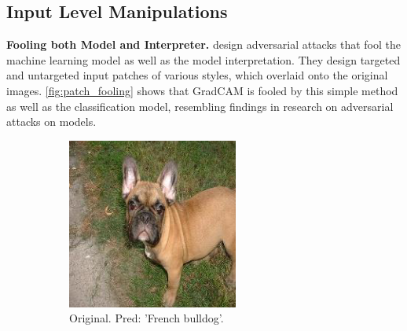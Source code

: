 \documentclass[sigconf]{acmart}
\newcommand{\mypar}[1]{\vspace{0.2cm}\noindent\textbf{#1}}
\begin{document}
\subsection{Input Level Manipulations}

\mypar{Fooling both Model and Interpreter. }\newline
\cite{subramanya2019fooling} design adversarial attacks that fool the machine learning model as well as the model interpretation. 
They design targeted and untargeted input patches of various styles, which overlaid onto the original images. 
\autoref{fig:patch_fooling} shows that GradCAM is fooled by this simple method as well as the classification model, resembling findings in research on adversarial attacks on models. 

\begin{figure}[ht]
    \centering
    \begin{subfigure}{0.32\linewidth}
      \includegraphics[width=\linewidth]{figures/patch_original.png}
      \caption{\scriptsize{Original. \newline Pred: 'French bulldog'.}}
      \label{fig:patch_original}
    \end{subfigure}
    \begin{subfigure}{0.32\linewidth}

\end{subfigure}
\end{figure}
\end{document}
